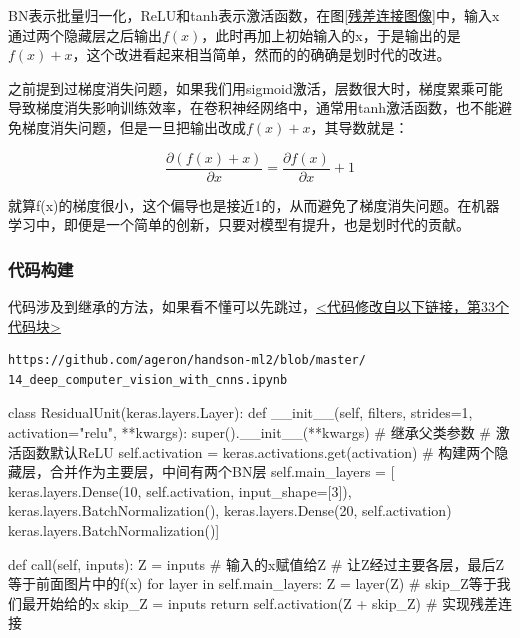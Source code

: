 \documentclass[a5paper, 11pt, openany]{book}
\begin{document}
BN表示批量归一化，ReLU和tanh表示激活函数，在图\ref{残差连接图像}中，输入x通过两个隐藏层之后输出$f(x)$，此时再加上初始输入的x，于是输出的是$f(x)+x$，这个改进看起来相当简单，然而的的确确是划时代的改进。

之前提到过梯度消失问题，如果我们用sigmoid激活，层数很大时，梯度累乘可能导致梯度消失影响训练效率，在卷积神经网络中，通常用tanh激活函数，也不能避免梯度消失问题，但是一旦把输出改成$f(x)+x$，其导数就是：

\begin{equation}
    \frac{\partial{(f(x)+x)}}{\partial{x}} = \frac{\partial{f(x)}}{\partial{x}} + 1
\end{equation}

就算f(x)的梯度很小，这个偏导也是接近1的，从而避免了梯度消失问题。在机器学习中，即便是一个简单的创新，只要对模型有提升，也是划时代的贡献。

\subsubsection{代码构建}

代码涉及到继承的方法，如果看不懂可以先跳过，\href{https://github.com/ageron/handson-ml2/blob/master/14_deep_computer_vision_with_cnns.ipynb}{<代码修改自以下链接，第33个代码块>}
\begin{verbatim}
https://github.com/ageron/handson-ml2/blob/master/
14_deep_computer_vision_with_cnns.ipynb
\end{verbatim}

\begin{python}
class ResidualUnit(keras.layers.Layer):
def __init__(self, filters, strides=1, activation="relu", **kwargs):
    super().__init__(**kwargs) # 继承父类参数
    # 激活函数默认ReLU
    self.activation = keras.activations.get(activation)
    # 构建两个隐藏层，合并作为主要层，中间有两个BN层
    self.main_layers = [
        keras.layers.Dense(10, self.activation, 
                            input_shape=[3]),
        keras.layers.BatchNormalization(),
        keras.layers.Dense(20, self.activation)
        keras.layers.BatchNormalization()]

def call(self, inputs):
    Z = inputs # 输入的x赋值给Z
    # 让Z经过主要各层，最后Z等于前面图片中的f(x)
    for layer in self.main_layers:
        Z = layer(Z)
    # skip_Z等于我们最开始给的x
    skip_Z = inputs
    return self.activation(Z + skip_Z) # 实现残差连接
\end{python}

\end{document}
